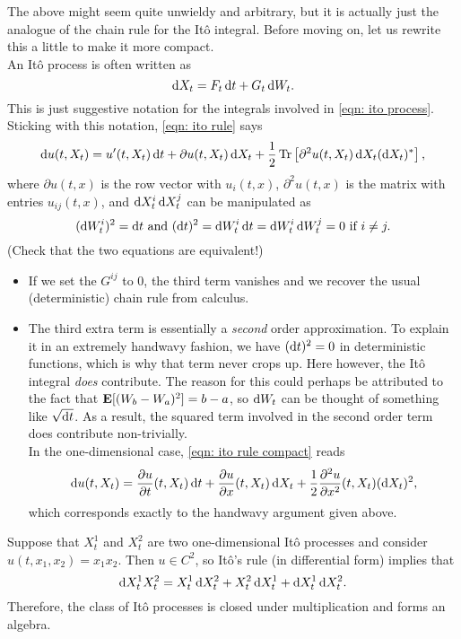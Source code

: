 The above might seem quite unwieldy and arbitrary, but it is actually just the analogue of the chain rule for the It\^{o} integral. Before moving on, let us rewrite this a little to make it more compact.\\
An It\^{o} process is often written as
\[ \operatorname{d}\!{X}_t = F_t \operatorname{d}\!{t} + G_t\operatorname{d}\!{W}_t. \]
This is just suggestive notation for the integrals involved in \eqref{eqn: ito process}. Sticking with this notation, \eqref{eqn: ito rule} says
\begin{equation}
	\label{eqn: ito rule compact}
	\operatorname{d}\!{u}(t,X_t) = u'(t,X_t)\operatorname{d}\!{t} + \partial u(t,X_t)\operatorname{d}\!{X}_t + \frac{1}{2} \operatorname{Tr}\left[\partial^2 u(t,X_t) \operatorname{d}\!{X}_t(\operatorname{d}\!{X}_t)^*\right],
\end{equation}
where $\partial u(t,x)$ is the row vector with $u_i(t,x)$, $\partial^2 u(t,x)$ is the matrix with entries $u_{ij}(t,x)$, and $\operatorname{d}\!{X}^i_t\operatorname{d}\!{X}^j_t$ can be manipulated as
\[ (\operatorname{d}\!{W}^i_t)^2 = \operatorname{d}\!{t} \text{ and } (\operatorname{d}\!{t})^2 = \operatorname{d}\!{W}^i_t\operatorname{d}\!{t} = \operatorname{d}\!{W}^i_t\operatorname{d}\!{W}^j_t = 0 \text{ if } i\neq j. \]
(Check that the two equations are equivalent!)
\begin{itemize}
	\item If we set the $G^{ij}$ to $0$, the third term vanishes and we recover the usual (deterministic) chain rule from calculus.
	\item The third extra term is essentially a \textit{second} order approximation. To explain it in an extremely handwavy fashion, we have $(\operatorname{d}\!{t})^2 = 0$ in deterministic functions, which is why that term never crops up. Here however, the It\^{o} integral \textit{does} contribute. The reason for this could perhaps be attributed to the fact that $\textbf{E}[(W_b-W_a)^2] = b-a$, so $\operatorname{d}\!{W}_t$ can be thought of something like $\sqrt{\operatorname{d}\!{t}}$. As a result, the squared term involved in the second order term does contribute non-trivially.\\
	In the one-dimensional case, \eqref{eqn: ito rule compact} reads
	\[ \operatorname{d}\!{u}(t,X_t) = \frac{\partial u}{\partial t} (t,X_t)\operatorname{d}\!{t} + \frac{\partial u}{\partial x} (t,X_t)\operatorname{d}\!{X_t} + \frac{1}{2} \frac{\partial^2 u}{\partial x^2}(t,X_t) (\operatorname{d}\!{X}_t)^2, \]
	which corresponds exactly to the handwavy argument given above.
\end{itemize}

Suppose that $X^1_t$ and $X^2_t$ are two one-dimensional It\^{o} processes and consider $u(t,x_1,x_2)=x_1x_2$. Then $u\in C^2$, so It\^{o}'s rule (in differential form) implies that
\[ \operatorname{d}\!{X_t^1 X_t^2} = X_t^1 \operatorname{d}\!{X}_t^2 + X_t^2 \operatorname{d}\!{X}_t^1 + \operatorname{d}\!{X}_t^1\operatorname{d}\!{X}_t^2. \]
Therefore, the class of It\^{o} processes is closed under multiplication and forms an algebra.

